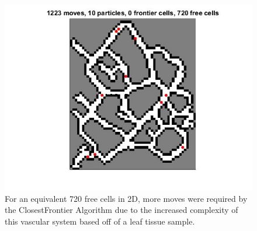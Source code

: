 \documentclass[letterpaper, 10 pt, conference]{ieeeconf}  %
\begin{document}
\begin{figure}
	\includegraphics[height=0.2\paperheight]{10particles_final.jpg}
	\caption{For an equivalent 720 free cells in 2D, more moves were required by the ClosestFrontier Algorithm due to the increased complexity of this vascular system based off of a leaf tissue sample.}
\end{figure}


\end{document}
